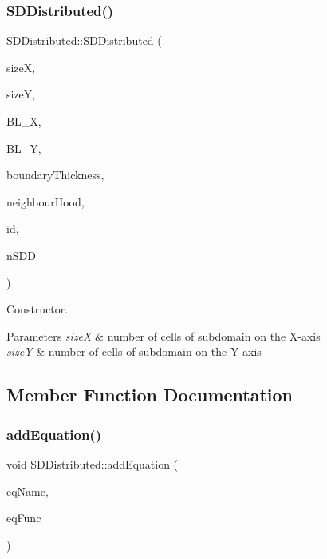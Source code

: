 \subsubsection{\texorpdfstring{S\+D\+Distributed()}{SDDistributed()}}
{\footnotesize\ttfamily S\+D\+Distributed\+::\+S\+D\+Distributed (\begin{DoxyParamCaption}\item[{unsigned int}]{sizeX,  }\item[{unsigned int}]{sizeY,  }\item[{int}]{B\+L\+\_\+X,  }\item[{int}]{B\+L\+\_\+Y,  }\item[{unsigned int}]{boundary\+Thickness,  }\item[{unsigned int}]{neighbour\+Hood,  }\item[{unsigned int}]{id,  }\item[{unsigned int}]{n\+S\+DD }\end{DoxyParamCaption})}



Constructor. 


\begin{DoxyParams}{Parameters}
{\em sizeX} & number of cells of subdomain on the X-\/axis \\
\hline
{\em sizeY} & number of cells of subdomain on the Y-\/axis \\
\hline
\end{DoxyParams}


\subsection{Member Function Documentation}
\mbox{\label{classSDDistributed_a0974e2cce9bfcddfd0acccd1105d980f}} 
\subsubsection{\texorpdfstring{add\+Equation()}{addEquation()}}
{\footnotesize\ttfamily void S\+D\+Distributed\+::add\+Equation (\begin{DoxyParamCaption}\item[{std\+::string}]{eq\+Name,  }\item[{eq\+Type}]{eq\+Func }\end{DoxyParamCaption})}



